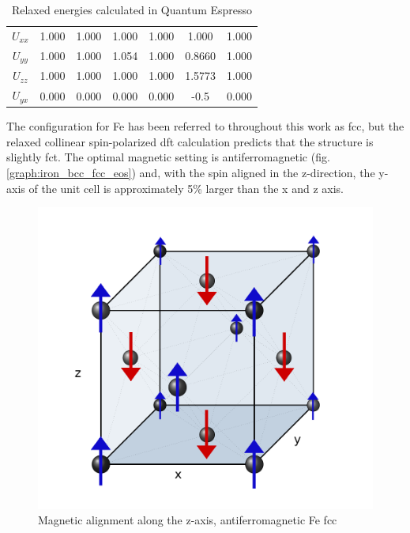\begin{landscape}
\begin{table}[h]
\begin{center}
\begin{tabular}{c c c c c c c}
$U_{xx}$                   & 1.000           & 1.000            & 1.000              & 1.000              & 1.000            & 1.000           \\
$U_{yy}$                   & 1.000           & 1.000            & 1.054              & 1.000               & 0.8660            & 1.000          \\
$U_{zz}$                   & 1.000           & 1.000            & 1.000              & 1.000                & 1.5773            & 1.000         \\
$U_{yx}$                   & 0.000           & 0.000            & 0.000              & 0.000                & -0.5            & 0.000         \\
\hline\hline
\end{tabular}
\end{center}
\caption{Relaxed energies calculated in Quantum Espresso}
\label{table:relaxedenergies}
\end{table}

\end{landscape}
\clearpage


The configuration for Fe has been referred to throughout this work as \acrshort{fcc}, but the relaxed collinear spin-polarized \acrshort{dft} calculation predicts that the structure is slightly \acrfull{fct}.  The optimal magnetic setting is antiferromagnetic (fig. \ref{graph:iron_bcc_fcc_eos}) and, with the spin aligned in the z-direction, the y-axis of the unit cell is approximately 5\% larger than the x and z axis.

\begin{figure}[ht] 
  \begin{minipage}[b]{0.8\linewidth}
    \centering
    \includegraphics[width=.9\linewidth]{chapters/potentials_fe_pd_ru/images/fe-austenitic-mag.png} 
    \caption{Magnetic alignment along the z-axis, antiferromagnetic Fe fcc}  
  \end{minipage}
  \label{fig:ironfccantiferromagnetic}
\end{figure}

